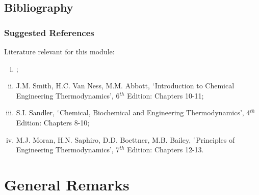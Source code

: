 \documentclass[10pt,compress,unknownkeysallowed]{beamer}
\begin{document}
\subsection{Bibliography}
\begin{frame}
 \frametitle{Suggested References}
  Literature relevant for this module:
  \begin{enumerate}[(i)]
   \item {};
   \item\label{SVN_Book} J.M. Smith, H.C. Van Ness, M.M. Abbott, $\lq$Introduction to Chemical Engineering Thermodynamics', 6$^{th}$ Edition: Chapters 10-11;
   \item\label{Sandle_Book} S.I. Sandler, $\lq$Chemical, Biochemical and Engineering Thermodynamics', 4$^{th}$ Edition: Chapters 8-10;
   \item M.J. Moran, H.N. Saphiro, D.D. Boettner, M.B. Bailey, $\lq$Principles of Engineering Thermodynamics', 7$^{th}$ Edition: Chapters 12-13.
  \end{enumerate}
\end{frame}



\section{General Remarks}
\end{document}
